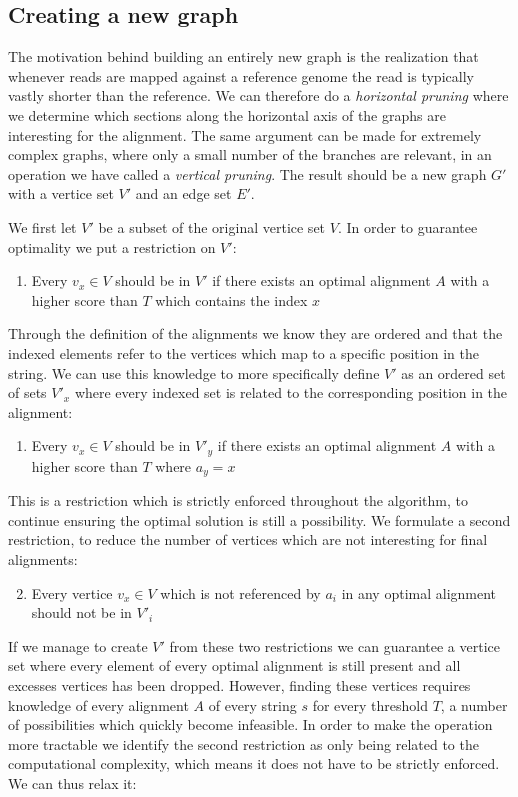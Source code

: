 \documentclass[thesis.tex]{subfiles}
\begin{document}
\subsection{Creating a new graph}
The motivation behind building an entirely new graph is the realization that whenever reads are mapped against a reference genome the read is typically vastly shorter than the reference. We can therefore do a \textit{horizontal pruning} where we determine which sections along the horizontal axis of the graphs are interesting for the alignment. The same argument can be made for extremely complex graphs, where only a small number of the branches are relevant, in an operation we have called a \textit{vertical pruning}. The result should be a new graph $G'$ with a vertice set $V'$ and an edge set $E'$.\\
\par\noindent
We first let $V'$ be a subset of the original vertice set $V$. In order to guarantee optimality we put a restriction on $V'$:
\begin{enumerate}
  \item Every $v_x \in V$ should be in $V'$ if there exists an optimal alignment $A$ with a higher score than $T$ which contains the index $x$
\end{enumerate}
Through the definition of the alignments we know they are ordered and that the indexed elements refer to the vertices which map to a specific position in the string. We can use this knowledge to more specifically define $V'$ as an ordered set of sets $V'_x$ where every indexed set is related to the corresponding position in the alignment:
\begin{enumerate}
  \item Every $v_x \in V$ should be in $V'_y$ if there exists an optimal alignment $A$ with a higher score than $T$ where $a_y=x$
\end{enumerate}
This is a restriction which is strictly enforced throughout the algorithm, to continue ensuring the optimal solution is still a possibility. We formulate a second restriction, to reduce the number of vertices which are not interesting for final alignments:
\begin{enumerate}
  \setcounter{enumi}{1}
  \item Every vertice $v_x \in V$ which is not referenced by $a_i$ in any optimal alignment should not be in $V'_i$
\end{enumerate}
If we manage to create $V'$ from these two restrictions we can guarantee a vertice set where every element of every optimal alignment is still present and all excesses vertices has been dropped. However, finding these vertices requires knowledge of every alignment $A$ of every string $s$ for every threshold $T$, a number of possibilities which quickly become infeasible. In order to make the operation more tractable we identify the second restriction as only being related to the computational complexity, which means it does not have to be strictly enforced. We can thus relax it:
\end{document}
